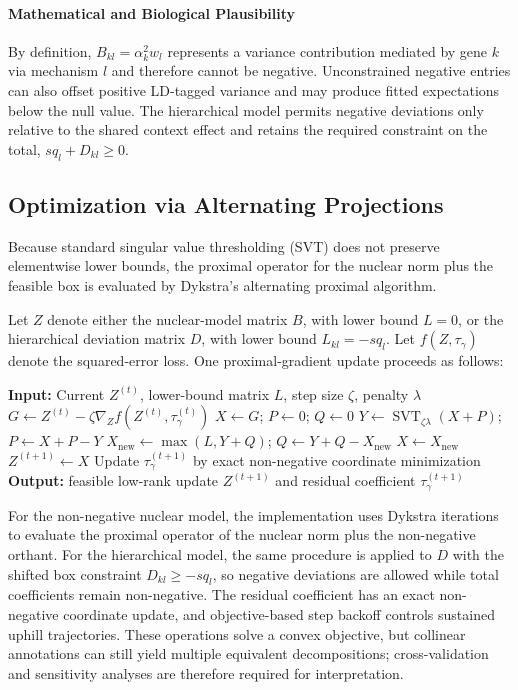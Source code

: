 \documentclass[11pt]{article}
\begin{document}
\paragraph{Mathematical and Biological Plausibility}
By definition, $B_{kl} = \alpha_k^2 w_l$ represents a variance contribution mediated by gene $k$ via mechanism $l$ and therefore cannot be negative. Unconstrained negative entries can also offset positive LD-tagged variance and may produce fitted expectations below the null value. The hierarchical model permits negative deviations only relative to the shared context effect and retains the required constraint on the total, $s q_l+D_{kl}\ge0$.

\subsection{Optimization via Alternating Projections}

Because standard singular value thresholding (SVT) does not preserve elementwise lower bounds, the proximal operator for the nuclear norm plus the feasible box is evaluated by Dykstra's alternating proximal algorithm.

Let $Z$ denote either the nuclear-model matrix $B$, with lower bound $L=0$, or the hierarchical deviation matrix $D$, with lower bound $L_{kl}=-s q_l$. Let $f(Z,\tau_\gamma)$ denote the squared-error loss. One proximal-gradient update proceeds as follows:

\begin{algorithm}[H]
\caption{Box-constrained nuclear-norm proximal update}
\begin{algorithmic}[1]
\State \textbf{Input:} Current $Z^{(t)}$, lower-bound matrix $L$, step size $\zeta$, penalty $\lambda$
\State $G \gets Z^{(t)}-\zeta\nabla_Z f(Z^{(t)},\tau_\gamma^{(t)})$
\State $X\gets G$; $P\gets0$; $Q\gets0$
\Repeat
    \State $Y\gets\operatorname{SVT}_{\zeta\lambda}(X+P)$; $P\gets X+P-Y$
    \State $X_{\mathrm{new}}\gets\max(L,Y+Q)$; $Q\gets Y+Q-X_{\mathrm{new}}$
    \State $X\gets X_{\mathrm{new}}$
\State $Z^{(t+1)}\gets X$
\State Update $\tau_\gamma^{(t+1)}$ by exact non-negative coordinate minimization
\State \textbf{Output:} feasible low-rank update $Z^{(t+1)}$ and residual coefficient $\tau_\gamma^{(t+1)}$
\end{algorithmic}
\end{algorithm}

For the non-negative nuclear model, the implementation uses Dykstra iterations to evaluate the proximal operator of the nuclear norm plus the non-negative orthant. For the hierarchical model, the same procedure is applied to $D$ with the shifted box constraint $D_{kl}\ge -s q_l$, so negative deviations are allowed while total coefficients remain non-negative. The residual coefficient has an exact non-negative coordinate update, and objective-based step backoff controls sustained uphill trajectories. These operations solve a convex objective, but collinear annotations can still yield multiple equivalent decompositions; cross-validation and sensitivity analyses are therefore required for interpretation.
\end{document}
